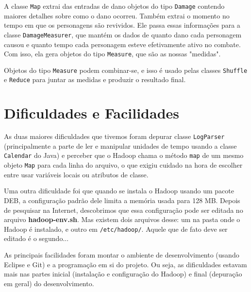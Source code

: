 \documentclass[a4paper,11pt]{article}
\begin{document}
  A classe \verb$Map$ extrai das entradas de dano objetos do tipo \verb$Damage$
  contendo maiores detalhes sobre como o dano ocorreu. Também extrai o momento
  no tempo em que os personagens são revividos. Ele passa essas informações para
  a classe \verb$DamageMeasurer$, que mantém os dados de quanto dano cada
  personagem causou e quanto tempo cada personagem esteve efetivamente ativo no
  combate. Com isso, ela gera objetos do tipo \verb$Measure$, que são as nossas
  "medidas".
  
  Objetos do tipo \verb$Measure$ podem combinar-se, e isso é usado pelas classes
  \verb$Shuffle$ e \verb$Reduce$ para juntar as medidas e produzir o resultado
  final.
  
\section{Dificuldades e Facilidades}

  As duas maiores dificuldades que tivemos foram depurar classe \verb$LogParser$
  (principalmente a parte de ler e manipular unidades de tempo usando a classe
  \verb$Calendar$ do Java) e perceber que o Hadoop chama o método \verb$map$ de
  um mesmo objeto \verb$Map$ para cada linha do arquivo, o que exigiu cuidado na
  hora de escolher entre usar variáveis locais ou atributos de classe.
  
  Uma outra dificuldade foi que quando se instala o Hadoop usando um pacote DEB,
  a configuração padrão dele limita a memória usada para 128 MB. Depois de
  pesquisar na Internet, descobrimos que essa configuração pode ser editada no
  arquivo \textbf{hadoop-env.sh}. Mas existem dois arquivos desse: um na pasta
  onde o Hadoop é instalado, e outro em \verb$/etc/hadoop/$. Aquele que de fato
  deve ser editado é o segundo...
  
  As principais facilidades foram montar o ambiente de desenvolvimento (usando
  Eclipse e Git) e a programação em si do projeto. Ou seja, as dificuldades
  estavam mais nas partes inicial (instalação e configuração do Hadoop) e final
  (depuração em geral) do desenvolvimento.
\end{document}
